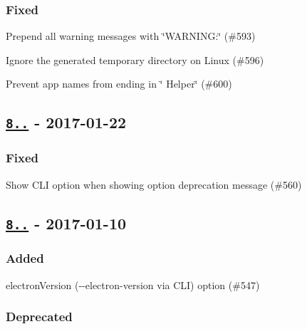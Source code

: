 \subsubsection*{Fixed}


\begin{DoxyItemize}
\item Prepend all warning messages with \char`\"{}\+W\+A\+R\+N\+I\+N\+G\+:\char`\"{} (\#593)
\item Ignore the generated temporary directory on Linux (\#596)
\item Prevent app names from ending in \char`\"{} Helper\char`\"{} (\#600)
\end{DoxyItemize}

\subsection*{\href{https://github.com/electron-userland/electron-packager/compare/v8.5.0...v8.5.1}{\tt 8..} -\/ 2017-\/01-\/22}

\subsubsection*{Fixed}


\begin{DoxyItemize}
\item Show C\+LI option when showing option deprecation message (\#560)
\end{DoxyItemize}

\subsection*{\href{https://github.com/electron-userland/electron-packager/compare/v8.4.0...v8.5.0}{\tt 8..} -\/ 2017-\/01-\/10}

\subsubsection*{Added}


\begin{DoxyItemize}
\item {\ttfamily electron\+Version} ({\ttfamily -\/-\/electron-\/version} via C\+LI) option (\#547)
\end{DoxyItemize}

\subsubsection*{Deprecated}



